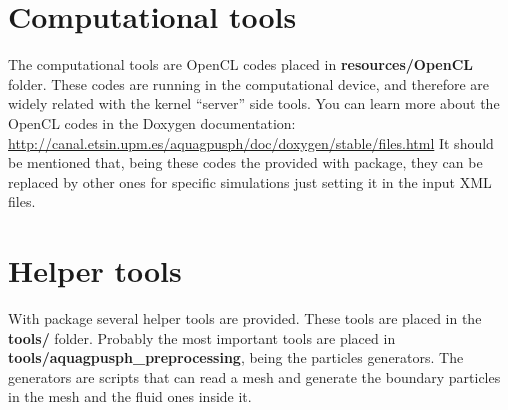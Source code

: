 \section{Computational tools}
\label{ss:structure::opencl}
%
The computational tools are OpenCL codes placed in \textbf{resources/OpenCL} folder.
%
These codes are running in the computational device, and therefore are widely related with the kernel ``server'' side tools.\rc
%
You can learn more about the OpenCL codes in the Doxygen documentation:\rc
%
\url{http://canal.etsin.upm.es/aquagpusph/doc/doxygen/stable/files.html}\rc
%
It should be mentioned that, being these codes the provided with \NAME package, they can be replaced by other ones for specific simulations just setting it in the input XML files.
%
\section{Helper tools}
\label{ss:structure::tools}
%
With \NAME package several helper tools are provided.
%
These tools are placed in the \textbf{tools/} folder.\rc
%
Probably the most important tools are placed in \textbf{tools/aquagpusph\_preprocessing}, being the particles generators.
%
The generators are scripts that can read a mesh and generate the boundary particles in the mesh and the fluid ones inside it.
%
